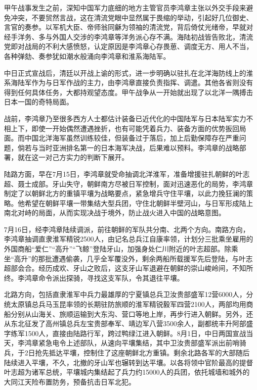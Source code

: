 \documentclass[12pt,UTF8]{ctexbook}
\begin{document}
甲午战事发生之前，深知中国军力底细的地方主管官员李鸿章主张以外交手段来避免冲突，不要贸然言战，这在清流党眼中显然属于畏缩的举动，引起好几位御史、言官的奏参。以军机大臣、帝师翁同龢为领袖的清流党，背后倚仗光绪帝，早就对经手洋务、多与外国人交涉的李鸿章等洋务派心存不满。海陆初战皆告败北，清流党即对战局的不利大感愤怒，认定原因是李鸿章心存畏葸、调度无方、用人不当，各种弹劾、奏参犹如潮水般涌向李鸿章和淮系海陆军。

中日正式宣战后，清廷以开战上谕的形式，进一步明确以驻扎在北洋海防线上的淮系海陆军作为与日军作战的主力，由李鸿章直接负责指挥、调遣。其他各省则没有得到任何具体任务，大都持观望态度。甲午战争从一开始就出现了以北洋一隅搏击日本一国的奇特局面。

战前，李鸿章乃至很多西方人士都估计装备已近代化的中国陆军与日本陆军实力不相上下，即使一开始偶然遭遇挫折，也有可能凭着兵力、装备方面的优势扳回局面。而中国北洋海军虽然训练较佳，但装备过于落后，加上后勤保障存在严重问题，倘若与当时亚洲排名第一的日本海军决战，后果难以预料。李鸿章的战略部署，就在这一对己方实力的判断下展开。

陆路方面，早在7月15日，李鸿章就受命抽调北洋淮军，准备增援驻扎朝鲜的叶志超、聂士成部。牙山失守，朝鲜南方尽被日军控制，面对迅速恶化的局势，李鸿章制定了以朝鲜北方的重镇平壤为战略要点，紧急增兵守住平壤，以此力挽狂澜的策略。他希望在朝鲜平壤一带集结大型兵团，守住北朝鲜半壁河山，与日军形成陆上南北对峙的局面，从而实现决战于境外，防止战火进入中国的战略意图。

7月16日，经李鸿章陆续调派，前往朝鲜的军队共分南、北两个方向。南路方向，李鸿章抽调直隶淮军精锐2500人，由记名总兵江自康率领，计划分三批乘坐雇用的外国商船“爱仁”“高升”“飞鲸”登陆牙山，加强身处仁川附近的叶志超部。除乘坐“高升”的那批遭遇偷袭，几乎全军覆没外，剩余两船所载援军先后登陆，与叶志超部会合。经历成欢、牙山之败后，这支牙山军退避在朝鲜的崇山峻岭间，不知所终。李鸿章命令派出探骑，寻找这支军队，令其退往平壤。

北路方向，包括直隶淮军中兵力最雄厚的宁夏镇总兵卫汝贵部盛军12营6000人，分统太原镇总兵马玉昆率领的长期驻防旅顺的淮军精锐毅军四营2100人，两部均用商船分别从山海关、旅顺运输到大东沟、营口等地上岸，再步行进入朝鲜。另外，还从东北征发了高州镇总兵左宝贵部奉军、靖边军八营3500余人，副都统丰升阿部盛字练军1500人，直接由陆路行军，跨过鸭绿江进入朝鲜。8月1日，中日两国宣战当天，李鸿章紧急电令上述部队，从速向平壤集结，其中卫汝贵部盛军派出前哨骑兵，于2日抢先抵达平壤，控制住了这座朝鲜北方重镇。剩余北路各军的大部随后陆续进入平壤，不久，北撤的牙山军也辗转到达平壤。以各将领中官阶最高的提督叶志超为诸军总统，平壤城内集结起了兵力约15000人的兵团，依托城墙和城外的大同江天险布置防务，预备抗击日军北犯。
\end{document}

